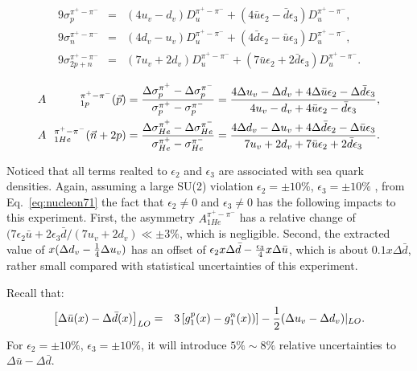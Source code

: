 \begin{eqnarray}  
 9 \sigma_p^{\pi^+ -\pi^-} & = & (4 u_v - d_v) D_u^{\pi^+ -\pi^-} + ( 4 \bar{u} \epsilon_2 - \bar{d} \epsilon_3) D_u^{\pi^+ -\pi^-}, \nonumber \\ 
 9 \sigma_n^{\pi^+ -\pi^-} & = & (4 d_v -u_v) D_u^{\pi^+ -\pi^-} + ( 4 \bar{d} \epsilon_2 - \bar{u} \epsilon_3) D_u^{\pi^+ -\pi^-}, \nonumber \\ 
 9 \sigma_{2p+n}^{\pi^+ -\pi^-} & = & (7u_v + 2 d_v) D_u^{\pi^+ -\pi^-} + (7 \bar{u} \epsilon_2 + 2 \bar{d} \epsilon_3) D_u^{\pi^+ -\pi^-}.
\label{eq:nucleon7}  
\end{eqnarray}  

\begin{eqnarray}
\label{eq:cllo}
&A&\hspace{-0.1cm}_{1p}^{\pi^+ - \pi^-}({\vec p})  =  { \Delta \sigma_p^{\pi^+}-\Delta \sigma_p^{\pi^-} \over
\sigma_p^{\pi^+} - \sigma_p^{\pi^-} }=
{  4\Delta u_v - \Delta d_v + 4 \Delta \bar{u} \epsilon_2 - \Delta \bar{d} \epsilon_3
\over 4u_v - d_v + 4 \bar{u} \epsilon_2 - \bar{d} \epsilon_3}, \\
&A&\hspace{-0.1cm}_{1He}^{\pi^+ - \pi^-} ({\vec n}+2p) =  { \Delta \sigma_{He}^{\pi^+}-\Delta \sigma_{He}^{\pi^-} \over
\sigma_{He}^{\pi^+}- \sigma_{He}^{\pi^-} }=
{ 4\Delta d_v - \Delta u_v + 4 \Delta \bar{d} \epsilon_2 - \Delta \bar{u} \epsilon_3
\over 7 u_v + 2 d_v + 7 \bar{u} \epsilon_2 + 2 \bar{d} \epsilon_3}. 
\label{eq:nucleon71}  
\end{eqnarray}

 Noticed that all terms realted to $\epsilon_2$ and $\epsilon_3$ are associated with sea quark densities.
 Again, assuming a large SU(2) violation  $\epsilon_2= \pm 10 \%$, $\epsilon_3= \pm 10 \%$ , from Eq.~\ref{eq:nucleon71} the fact that $\epsilon_2 \ne 0$ and $\epsilon_3 \ne 0$
has the following impacts to this experiment. First, the asymmetry $A_{1He}^{\pi^+ - \pi^-}$ has a relative change
of $(7 \epsilon_2 \bar{u} + 2 \epsilon_3 \bar{d} / (7 u_v + 2 d_v) \ll  \pm 3 \%$, which is negligible. Second, 
the extracted value of $x(\Delta d_v -{1 \over 4} \Delta u_v)$ has an offset of $\epsilon_2 x \Delta \bar{d}- {\epsilon_3 \over 4}  x \Delta \bar{u}$, 
which is about $0.1 x \Delta  \bar{d}$, rather small compared with statistical uncertainties of this experiment.  

Recall that:
\begin{eqnarray}
\left[\Delta \bar{u}(x) - \Delta \bar{d}(x) \right]_{LO} & = & 3 \left[ g_1^p(x)- g_1^n(x)) \right] 
 - {1 \over 2} (\Delta u_v - \Delta d_v) \vert_{LO}.
\end{eqnarray}
For $\epsilon_2= \pm 10 \%$, $\epsilon_3= \pm 10 \%$,  it will introduce $5\% \sim 8 \%$ relative uncertainties to $\Delta \bar{u} -\Delta \bar{d}$. 
